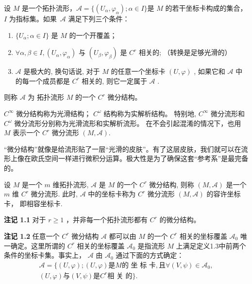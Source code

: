 \begin{definition}[微分结构]
    设 $M$ 是一个拓扑流形，$\mathcal{A}  = \{(U_\alpha, \varphi_\alpha); \alpha \in I\}$是 $M$ 的若干坐标卡构成的集合，$I$ 为指标集。如果~$\mathcal{A} $ 满足下列三个条件：
    \begin{enumerate}[(1)]
        \item $\{U_\alpha; \alpha \in I\}$ 是 $M$ 的一个开覆盖；
        \item $\forall \alpha, \beta \in I, (U_{\alpha}, \varphi_{\alpha})$  与  $(U_{\beta}, \varphi_{\beta})$  是  $C^r$  相关的; （转换是足够光滑的） 
         \item  $\mathcal{A}$  是极大的, 换句话说, 对于  $M$  的任意一个坐标卡  $(U, \varphi)$ , 如果它和  $\mathcal{A}$  中的每一个成员都是  $C^r$  相关的, 则它一定属于  $\mathcal{A}$ .
    \end{enumerate}
    则称 $\mathcal{A} $ 为 拓扑流形 $M$ 的一个 $C^r$ 微分结构。%
\end{definition}

$C^\infty$  微分结构称为光滑结构；  $C^\omega$  结构称为实解析结构。
特别地,  $C^\infty$  微分流形和  $C^\omega$  微分流形分别称为光滑流形和实解析流形。
在不会引起混淆的情况下，也用  $M$  表示一个  $C^r$  微分流形  $(M, \mathcal{A})$.

\begin{myremark}[微分结构的直观解读]
“微分结构”就像是给流形贴了一层“光滑的皮肤”。有了这层皮肤，我们就可以在流形上像在欧氏空间一样进行微积分运算。极大性是为了确保这套“参考系”是最完备的。
\end{myremark}

\begin{definition}[容许坐标卡]
设  $M$  是一个  $m$  维拓扑流形,  $\mathcal{A}$  是  $M$  的一个  $C^r$  微分结构, 则称  $(M, \mathcal{A})$  是一个  $m$  维  $C^r$  微分流形. 此时,  $\mathcal{A}$  中的坐标卡称为  $C^r$  微分流形  $(M, \mathcal{A})$  的容许坐标卡， 即相容坐标卡.

\end{definition}


{\bf 注记 1.1} 对于  $r \geqslant 1$ ，并非每一个拓扑流形都有  $C^r$  的微分结构。

{\bf 注记 1.2} 任意一个  $C^r$  微分结构  $\mathcal{A}$  都可以由  $M$  的一个  $C^r$  相关的坐标覆盖  $\mathcal{A}_0$  唯一确定。这里所谓的  $C^r$  相关的坐标覆盖  $\mathcal{A}_0$  是指流形  $M$  上满足定义1.3中前两个条件的坐标卡集。事实上， $\mathcal{A}$  由  $\mathcal{A}_0$  通过下面的方式确定：
$$
\begin{array}{l} \mathcal {A} = \{(U, \varphi); (U, \varphi) \text {是} M   \text {的 坐 标 卡},   \text {且}   \forall (V, \psi) \in \mathcal {A} _ {0}, \\ (U, \varphi) \text {与} (V, \psi) \text {是} C ^ {r} \text {相 关 的} \}. 
\\ \end{array}
$$

